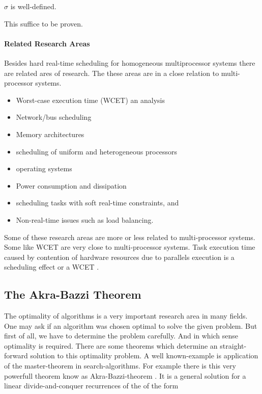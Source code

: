 	
	\begin{lemma}
	 $\sigma$ is well-defined.
	\end{lemma}
	This suffice to be proven.
	
	\paragraph{Related Research Areas}
	\label{par:RelatedResearchAreas}
	
		Besides hard real-time scheduling for homogeneous multiprocessor systems there are related ares of research. The these areas are in a  close relation to multi-processor systems.
		\begin{itemize}
		\item Worst-case execution time (WCET) an analysis
		\item Network/bus scheduling
		\item Memory architectures
		\item scheduling of uniform and heterogeneous processors
		\item operating systems
		\item Power consumption and dissipation
		\item scheduling tasks with soft real-time constraints, and
		\item Non-real-time issues such as load balancing.
		\end{itemize}
		Some of these research areas are more or less related to multi-processor systems. Some like WCET are very close to multi-processor systems.
		Task execution time caused by contention of hardware resources due to parallels execution is a scheduling effect or a WCET \cite[Sec. 10.2]{DB2011}.
		
 
\subsection{The Akra-Bazzi Theorem}
\label{subsection:The Akra-Bazzi Theorem}

	The optimality of algorithms is a very important research area in many fields.
	One may ask if an algorithm was chosen optimal to solve the given problem.
	But first of all, we have to determine the problem carefully. And in which sense optimality is required. There are some theorems which determine an straight-forward solution to this optimality problem. A well known-example is application of the master-theorem in search-algorithms. %
	For example there is this very powerfull theorem know as Akra-Bazzi-theorem \cite{AB98}.
	It is a general solution for a linear divide-and-conquer recurrences of the of the form

